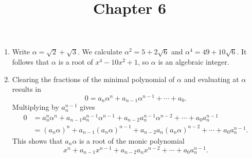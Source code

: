 \documentclass[12pt]{article}
\title{Chapter 6}
\author{}\date{}
\begin{document}
\maketitle

\begin{enumerate}
\item %
Write $\alpha=\sqrt{2}+\sqrt{3}$.
We calculate $\alpha^2=5+2\sqrt{6}$
and $\alpha^4=49+10\sqrt{6}$.
It follows that $\alpha$ is a root of
$x^4-10x^2+1$, so $\alpha$ is an algebraic integer.

\item %
Clearing the fractions of the minimal polynomial of $\alpha$
and evaluating at $\alpha$ results in
\[0=a_n\alpha^n+a_{n-1}\alpha^{n-1}+\cdots+a_0.\]
Multiplying by $a_n^{n-1}$ gives
\begin{align*}
0&=a_n^n\alpha^n+a_{n-1}a_n^{n-1}\alpha^{n-1}
+a_{n-2}a_n^{n-1}\alpha^{n-2}+\cdots+a_0a_n^{n-1}\\
&=\left(a_n\alpha\right)^n
+a_{n-1}\left(a_n\alpha\right)^{n-1}
+a_{n-2}a_n\left(a_n\alpha\right)^{n-2}
+\cdots+a_0a_n^{n-1}.
\end{align*}
This shows that $a_n\alpha$ is a root of the monic polynomial
\[x^n+a_{n-1}x^{n-1}+a_{n-2}a_nx^{n-2}+\cdots+a_0a_n^{n-1}.\]

\end{enumerate}
\end{document}
